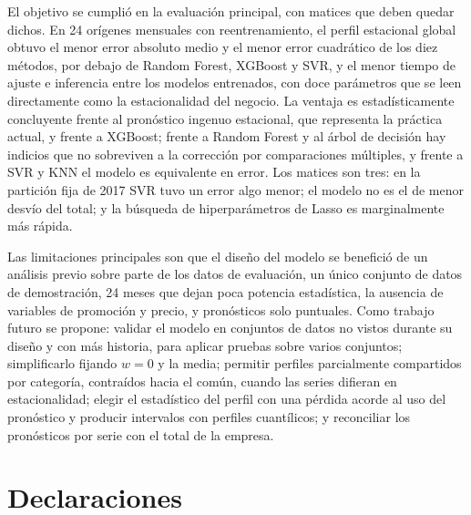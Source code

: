 \documentclass[pdflatex,sn-mathphys-num]{sn-jnl}
\begin{document}
El objetivo se cumplió en la evaluación principal, con matices que deben quedar dichos. En 24 orígenes mensuales con reentrenamiento, el perfil estacional global obtuvo el menor error absoluto medio y el menor error cuadrático de los diez métodos, por debajo de Random Forest, XGBoost y SVR, y el menor tiempo de ajuste e inferencia entre los modelos entrenados, con doce parámetros que se leen directamente como la estacionalidad del negocio. La ventaja es estadísticamente concluyente frente al pronóstico ingenuo estacional, que representa la práctica actual, y frente a XGBoost; frente a Random Forest y al árbol de decisión hay indicios que no sobreviven a la corrección por comparaciones múltiples, y frente a SVR y KNN el modelo es equivalente en error. Los matices son tres: en la partición fija de 2017 SVR tuvo un error algo menor; el modelo no es el de menor desvío del total; y la búsqueda de hiperparámetros de Lasso es marginalmente más rápida.

Las limitaciones principales son que el diseño del modelo se benefició de un análisis previo sobre parte de los datos de evaluación, un único conjunto de datos de demostración, 24 meses que dejan poca potencia estadística, la ausencia de variables de promoción y precio, y pronósticos solo puntuales. Como trabajo futuro se propone: validar el modelo en conjuntos de datos no vistos durante su diseño y con más historia, para aplicar pruebas sobre varios conjuntos; simplificarlo fijando $w=0$ y la media; permitir perfiles parcialmente compartidos por categoría, contraídos hacia el común, cuando las series difieran en estacionalidad; elegir el estadístico del perfil con una pérdida acorde al uso del pronóstico y producir intervalos con perfiles cuantílicos; y reconciliar los pronósticos por serie con el total de la empresa.

\backmatter

\section*{Declaraciones}
\end{document}
